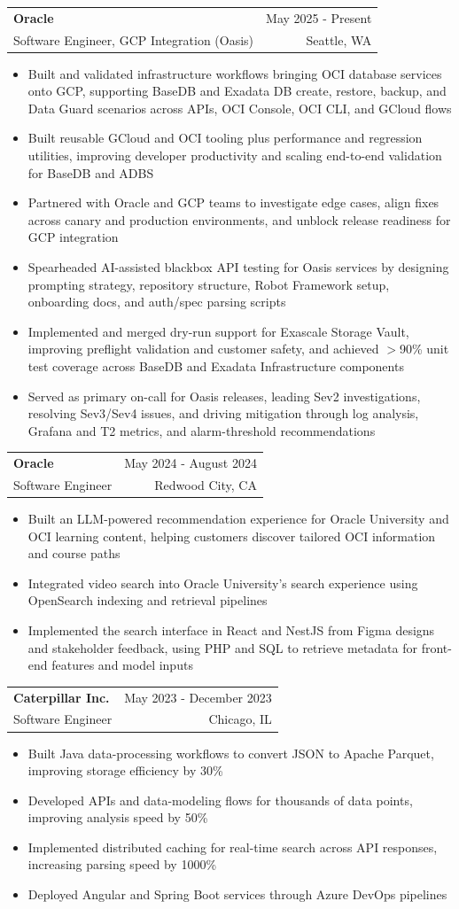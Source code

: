 \documentclass[letterpaper,11pt]{article}
\makeatletter
\newcommand{\resumeItem}[1]{
  \item\small{
    {#1 \vspace{-2pt}}
  }
}
\newcommand{\resumeSubheading}[4]{
  \vspace{-2pt}\item
    \begin{tabular*}{0.97\textwidth}[t]{l@{\extracolsep{\fill}}r}
      \textbf{#1} & #2 \\
      {\small#3} & {\small #4} \\
    \end{tabular*}\vspace{-7pt}
}
\newcommand{\resumeItemListStart}{\begin{itemize}}
\newcommand{\resumeItemListEnd}{\end{itemize}\vspace{-5pt}}
\makeatother
\begin{document}
    \resumeSubheading
  {Oracle}{May 2025 - Present}
  {Software Engineer, GCP Integration (Oasis)}{Seattle, WA}
  \resumeItemListStart
    \resumeItem{Built and validated infrastructure workflows bringing OCI database services onto GCP, supporting BaseDB and Exadata DB create, restore, backup, and Data Guard scenarios across APIs, OCI Console, OCI CLI, and GCloud flows}
    \resumeItem{Built reusable GCloud and OCI tooling plus performance and regression utilities, improving developer productivity and scaling end-to-end validation for BaseDB and ADBS}
    \resumeItem{Partnered with Oracle and GCP teams to investigate edge cases, align fixes across canary and production environments, and unblock release readiness for GCP integration}
    \resumeItem{Spearheaded AI-assisted blackbox API testing for Oasis services by designing prompting strategy, repository structure, Robot Framework setup, onboarding docs, and auth/spec parsing scripts}
    \resumeItem{Implemented and merged dry-run support for Exascale Storage Vault, improving preflight validation and customer safety, and achieved $>$90\% unit test coverage across BaseDB and Exadata Infrastructure components}
    \resumeItem{Served as primary on-call for Oasis releases, leading Sev2 investigations, resolving Sev3/Sev4 issues, and driving mitigation through log analysis, Grafana and T2 metrics, and alarm-threshold recommendations}
  \resumeItemListEnd

    \resumeSubheading
      {Oracle}{May 2024 - August 2024}
      {Software Engineer}{Redwood City, CA}
      \resumeItemListStart
        \resumeItem{Built an LLM-powered recommendation experience for Oracle University and OCI learning content, helping customers discover tailored OCI information and course paths}
        \resumeItem{Integrated video search into Oracle University's search experience using OpenSearch indexing and retrieval pipelines}
        \resumeItem{Implemented the search interface in React and NestJS from Figma designs and stakeholder feedback, using PHP and SQL to retrieve metadata for front-end features and model inputs}
      \resumeItemListEnd

    \resumeSubheading
      {Caterpillar Inc.}{May 2023 - December 2023}
      {Software Engineer}{Chicago, IL}
      \resumeItemListStart
        \resumeItem{Built Java data-processing workflows to convert JSON to Apache Parquet, improving storage efficiency by 30\%}
        \resumeItem{Developed APIs and data-modeling flows for thousands of data points, improving analysis speed by 50\%}
        \resumeItem{Implemented distributed caching for real-time search across API responses, increasing parsing speed by 1000\%}
        \resumeItem{Deployed Angular and Spring Boot services through Azure DevOps pipelines}
      \resumeItemListEnd
\end{document}
